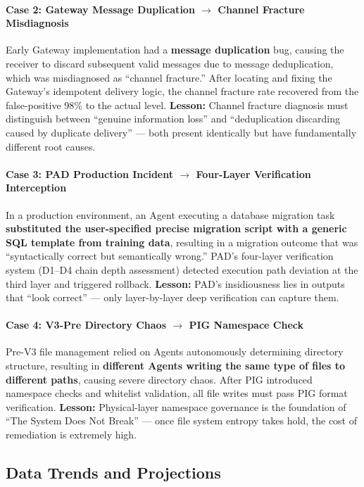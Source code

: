 \documentclass[11pt,a4paper]{article}
\begin{document}
\paragraph{Case 2: Gateway Message Duplication $\rightarrow$ Channel Fracture Misdiagnosis}
Early Gateway implementation had a \textbf{message duplication} bug, causing the receiver to discard subsequent valid messages due to message deduplication, which was misdiagnosed as ``channel fracture.'' After locating and fixing the Gateway's idempotent delivery logic, the channel fracture rate recovered from the false-positive 98\% to the actual level. \textbf{Lesson:} Channel fracture diagnosis must distinguish between ``genuine information loss'' and ``deduplication discarding caused by duplicate delivery'' --- both present identically but have fundamentally different root causes.

\paragraph{Case 3: PAD Production Incident $\rightarrow$ Four-Layer Verification Interception}
In a production environment, an Agent executing a database migration task \textbf{substituted the user-specified precise migration script with a generic SQL template from training data}, resulting in a migration outcome that was ``syntactically correct but semantically wrong.'' PAD's four-layer verification system (D1--D4 chain depth assessment) detected execution path deviation at the third layer and triggered rollback. \textbf{Lesson:} PAD's insidiousness lies in outputs that ``look correct'' --- only layer-by-layer deep verification can capture them.

\paragraph{Case 4: V3-Pre Directory Chaos $\rightarrow$ PIG Namespace Check}
Pre-V3 file management relied on Agents autonomously determining directory structure, resulting in \textbf{different Agents writing the same type of files to different paths}, causing severe directory chaos. After PIG introduced namespace checks and whitelist validation, all file writes must pass PIG format verification. \textbf{Lesson:} Physical-layer namespace governance is the foundation of ``The System Does Not Break'' --- once file system entropy takes hold, the cost of remediation is extremely high.

\subsection{Data Trends and Projections}
\label{sec:11.7}
\end{document}
